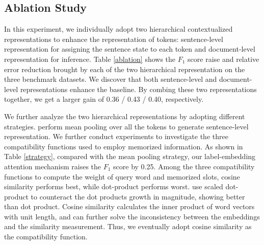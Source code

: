 \documentclass[letterpaper]{article} \usepackage{aaai20}  \usepackage{times}  \usepackage{helvet} \usepackage{courier}  \usepackage[hyphens]{url}  \usepackage{graphicx} \urlstyle{rm} \def\UrlFont{\rm}  \usepackage{graphicx}  \frenchspacing  \setlength{\pdfpagewidth}{8.5in}  \setlength{\pdfpageheight}{11in}
\begin{document}
\begin{table}[t!] 
\centering
{}
\caption{Comparison of different strategies on CoNLL-2003 dataset. ERR is the relative error rate reduction of our model compared to the baseline.}
\label{strategy}
\end{table} 

 \subsection{Ablation Study}
 In this experiment, we individually adopt two hierarchical contextualized representations to enhance the representation of tokens: sentence-level representation for assigning the sentence state to each token and document-level representation for inference. Table \ref{ablation} shows the $F_1$ score raise and relative error reduction brought by each of the two hierarchical representation on the three benchmark datasets. We discover that both sentence-level and document-level representations enhance the baseline. By combing these two representations together, we get a larger gain of 0.36 / 0.43 / 0.40, respectively.
 
We further analyze the two hierarchical representations by adopting different strategies. \cite{liu2019gcdt} perform mean pooling over all the tokens to generate sentence-level representation. We further conduct experiments to investigate the three compatibility functions used to employ memorized information. As shown in Table \ref{strategy}, compared with the mean pooling strategy, our label-embedding attention mechanism raises the $F_1$ score by 0.25. Among the three compatibility functions to compute the weight of query word and memorized slots,
cosine similarity performs best, while dot-product performs worst.
\cite{vaswani2017attention} use scaled dot-product to counteract the dot products growth in magnitude, showing better than dot product.
Cosine similarity calculates the inner product of word vectors with unit length, and can further solve the inconsistency between the embeddings and the similarity measurement. Thus, we eventually adopt cosine similarity as the compatibility function.
\end{document}
